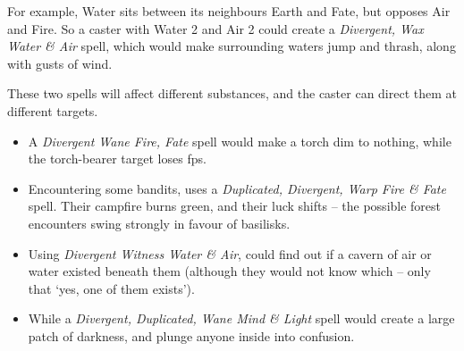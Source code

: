 \begin{multicols}{2}
For example, Water sits between its neighbours Earth and Fate, but opposes Air and Fire.
So a caster with Water 2 and Air 2 could create a \textit{Divergent, Wax Water \& Air} spell, which would make surrounding waters jump and thrash, along with gusts of wind.

These two spells will affect different substances, and the caster can direct them at different targets.

\begin{itemize}
  \item
  A \textit{Divergent Wane Fire, Fate} spell would make a torch dim to nothing, while the torch-bearer target loses \glspl{fp}.
  \item
  Encountering some bandits,  uses a \textit{Duplicated, Divergent, Warp Fire \& Fate} spell.
  Their campfire burns green, and their luck shifts -- the possible forest encounters swing strongly in favour of basilisks.
  \item
  Using \textit{Divergent Witness Water \& Air},  could find out if a cavern of air or water existed beneath them (although they would not know which -- only that `yes, one of them exists').
  \item
  While a \textit{Divergent, Duplicated, Wane Mind \& Light} spell would create a large patch of darkness, and plunge anyone inside into confusion.
\end{itemize}


\end{multicols}
